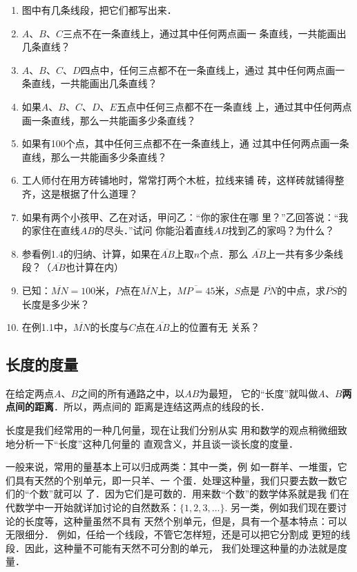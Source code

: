 \begin{ex}
\begin{enumerate}
	\item 图中有几条线段，把它们都写出来．
	\item $A$、$B$、$C$三点不在一条直线上，通过其中任何两点画一
	条直线，一共能画出几条直线？
	\item $A$、$B$、$C$、$D$四点中，任何三点都不在一条直线上，通过
	其中任何两点画一条直线，一共能画出几条直线？
	\item 如果$A$、$B$、$C$、$D$、$E$五点中任何三点都不在一条直线
上，通过其中任何两点画一条直线，那么一共能画多少条直线？
	\item 如果有100个点，其中任何三点都不在一条直线上，通
	过其中任何两点画一条直线，那么一共能画多少条直线？
	\item 工人师付在用方砖铺地时，常常打两个木桩，拉线来铺
	砖，这样砖就铺得整齐，这是根据了什么道理？
\item 如果有两个小孩甲、乙在对话，甲问乙：“你的家住在哪
里？”乙回答说：“我的家住在直线$AB$的尽头．”试问
你能沿着直线$AB$找到乙的家吗？为什么？
\item 参看例1.4的归纳、计算，如果在$\overline{AB}$上取$n$个点．那么
$\overline{AB}$上一共有多少条线段？（$\overline{AB}$也计算在内）
\item 已知：$\overline{MN}=100$米，$P$点在$\overline{MN}$上，$\overline{MP=45}$米，$S$点是
$\overline{PN}$的中点，求$\overline{PS}$的长度是多少米？
\item 在例1.1中，$\overline{MN}$的长度与$C$点在$\overline{AB}$上的位置有无
关系？
\end{enumerate}
\end{ex}


\subsection{长度的度量}
在给定两点$A$、$B$之间的所有通路之中，以$AB$为最短，
它的“长度”就叫做$A$、$B$\textbf{两点间的距离}．所以，两点间的
距离是连结这两点的线段的长．

长度是我们经常用的一种几何量，现在让我们分别从实
用和数学的观点稍微细致地分析一下“长度”这种几何量的
直观含义，并且谈一谈长度的度量．

一般来说，常用的量基本上可以归成两类：其中一类，例
如一群羊、一堆蛋，它们具有天然的个别单元，即一只羊、一
个蛋．处理这种量，我们只要去数一数它们的“个数”就可以
了．因为它们是可数的．用来数“个数”的数学体系就是我
们在代数学中一开始就详加讨论的自然数系：$\{1,2,3,\ldots\}$. 另一类，例如我们现在要讨论的长度等，这种量虽然不具有
天然个别单元，但是，具有一个基本特点：可以无限细分．
例如，任给一个线段，不管它怎样短，还是可以把它分割成
更短的线段．因此，这种量不可能有天然不可分割的单元，
我们处理这种量的办法就是度量．

